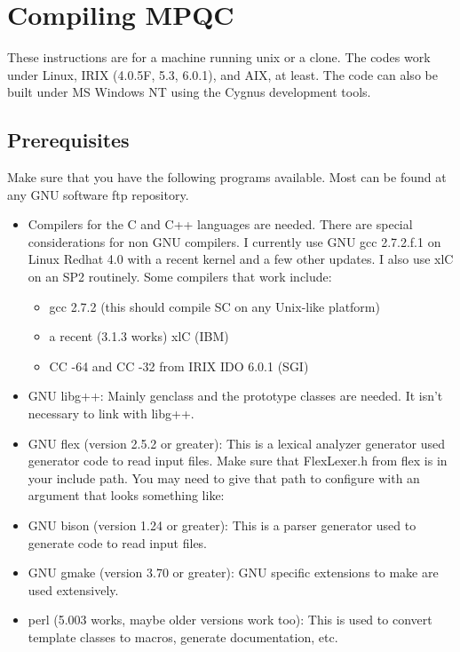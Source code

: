
\chapter{Compiling MPQC}


These instructions are for a machine running unix or a clone. The codes
work under Linux, IRIX (4.0.5F, 5.3, 6.0.1), and AIX, at least.  The code
can also be built under MS Windows NT using the Cygnus development tools.

\section{Prerequisites}
 Make sure that you have the following programs available. Most can be
found at any GNU software ftp repository.
  \begin{itemize}
    \item Compilers for the C and C++ languages are needed.
          There are special considerations for non
          GNU compilers. I currently use GNU gcc 2.7.2.f.1 on Linux Redhat 4.0
          with a recent kernel and a few other updates. I also use
          xlC on an SP2 routinely. Some compilers that work include:
      \begin{itemize}
        \item  gcc 2.7.2 (this should compile SC on any Unix-like platform)
        \item  a recent (3.1.3 works) xlC (IBM)
        \item  CC -64 and CC -32 from IRIX IDO 6.0.1 (SGI)
      \end{itemize}
    \item GNU libg++: Mainly genclass and the prototype classes are needed.
          It isn't necessary to link with libg++.
    \item GNU flex (version 2.5.2 or greater): This is a lexical analyzer
          generator used generator code to read input files. Make sure that
          FlexLexer.h from flex is in your include path. You may need to
          give that path to configure with an argument that looks something
          like: 
    \item GNU bison (version 1.24 or greater): This is a parser generator used
          to generate code to read input files.
    \item GNU gmake (version 3.70 or greater): GNU specific extensions to make
          are used extensively.
    \item perl (5.003 works, maybe older versions work too): This is used to
          convert template classes to macros, generate documentation, etc.
  \end{itemize}

